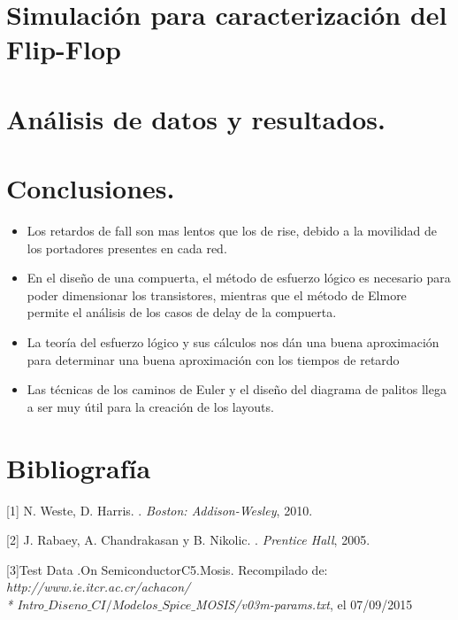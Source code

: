 \documentclass[12pt,a4paper]{article} %
\begin{document}
\section{Simulación para caracterización del Flip-Flop}



\section{Análisis de datos y resultados.}






\section{Conclusiones.}
\begin{itemize}
\item Los retardos de fall son mas lentos que los de rise, debido a la movilidad de los portadores presentes en cada red.
\item En el diseño de una compuerta, el método de esfuerzo lógico es necesario para poder dimensionar los transistores, mientras que el método de Elmore permite el análisis de los casos de delay de la compuerta.
\item La teoría del esfuerzo lógico y sus cálculos nos dán una buena aproximación para determinar una buena aproximación con los tiempos de retardo
\item Las técnicas de los caminos de Euler y el diseño del diagrama de palitos llega a ser muy útil para la creación de los layouts.

\end{itemize}

\section{Bibliografía}
\begin{thebibliography}{3}


[1] N. Weste, D. Harris. 
.
\newblock \emph{Boston: Addison-Wesley}, 2010.

[2] J. Rabaey, A. Chandrakasan y B. Nikolic. 
.
\newblock \emph{Prentice Hall}, 2005.

[3]Test Data .On SemiconductorC5.Mosis. Recompilado de:
\newblock \emph{http://www.ie.itcr.ac.cr/achacon/ \\* Intro$\_Diseno\_CI/Modelos\_Spice\_$MOSIS/v03m-params.txt}, el 07/09/2015

\end{thebibliography}
\end{document}
